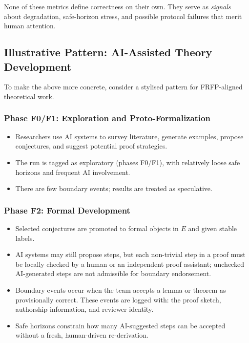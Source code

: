 None of these metrics define correctness on their own.
They serve as \emph{signals} about degradation, safe-horizon stress, and
possible protocol failures that merit human attention.

\subsection{Illustrative Pattern: AI-Assisted Theory Development}

To make the above more concrete, consider a stylised pattern for FRFP-aligned
theoretical work.

\subsubsection*{Phase F0/F1: Exploration and Proto-Formalization}

\begin{itemize}
  \item Researchers use AI systems to survey literature, generate examples,
        propose conjectures, and suggest potential proof strategies.
  \item The run is tagged as exploratory (phases F0/F1), with relatively
        loose safe horizons and frequent AI involvement.
  \item There are few boundary events; results are treated as speculative.
\end{itemize}

\subsubsection*{Phase F2: Formal Development}

\begin{itemize}
  \item Selected conjectures are promoted to formal objects in $E$ and given
        stable labels.
  \item AI systems may still propose steps, but each non-trivial step in a
        proof must be locally checked by a human or an independent proof
        assistant; unchecked AI-generated steps are not admissible for boundary
        endorsement.
  \item Boundary events occur when the team accepts a lemma or theorem as
        provisionally correct.
        These events are logged with:
        the proof sketch, authorship information, and reviewer identity.
  \item Safe horizons constrain how many AI-suggested steps can be accepted
        without a fresh, human-driven re-derivation.
\end{itemize}

